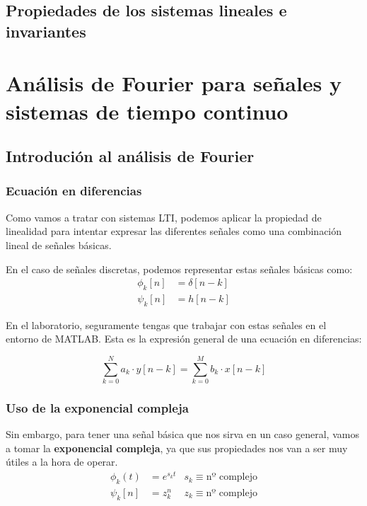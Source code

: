 \documentclass[a4paper]{book}
\begin{document}
\section{Propiedades de los sistemas lineales e invariantes}





\chapter{Análisis de Fourier para señales y sistemas de tiempo continuo}

\section{Introdución al análisis de Fourier}
\subsection{Ecuación en diferencias}

Como vamos a tratar con sistemas LTI, podemos aplicar la propiedad de linealidad para intentar expresar las diferentes señales como una combinación lineal de señales básicas.

En el caso de señales discretas, podemos representar estas señales básicas como:
\begin{align*}
\phi_k[n]  & = \delta [n-k] \\
\psi _k[n] & = h[n-k]
\end{align*}

En el laboratorio, seguramente tengas que trabajar con estas señales en el entorno de MATLAB. Esta es la expresión general de una ecuación en diferencias:

\[\sum^{N}_{k=0}{a_k\cdot y[n-k]} = \sum^{M}_{k=0}{b_k\cdot x[n-k]}\]

\subsection{Uso de la exponencial compleja}

Sin embargo, para tener una señal básica que nos sirva en un caso general, vamos a tomar la \textbf{exponencial compleja}, ya que sus propiedades nos van a ser muy útiles a la hora de operar.
\begin{align*}
&  &  &  &  &  &  &  & \phi_k(t)  & = e^{s_kt} & s_k \equiv \text{nº complejo} &  &  &  &  &  &  &  & \\
&  &  &  &  &  &  &  & \psi _k[n] & = z_k^n    & z_k \equiv \text{nº complejo} &  &  &  &  &  &  &  &
\end{align*}
\end{document}
